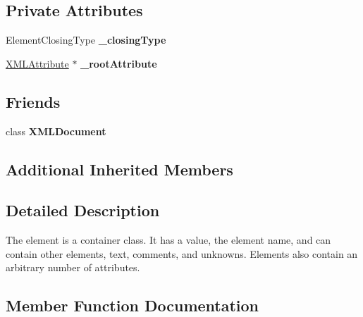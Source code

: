 \subsection*{Private Attributes}
\begin{DoxyCompactItemize}
\item 
Element\+Closing\+Type {\bfseries \+\_\+closing\+Type}\hypertarget{classtinyxml2_1_1XMLElement_a3f3f8f60bc21aae4c1bb9470d7ab0823}{}\label{classtinyxml2_1_1XMLElement_a3f3f8f60bc21aae4c1bb9470d7ab0823}

\item 
\hyperlink{classtinyxml2_1_1XMLAttribute}{X\+M\+L\+Attribute} $\ast$ {\bfseries \+\_\+root\+Attribute}\hypertarget{classtinyxml2_1_1XMLElement_ad067115a9f42b2df1fcdf3e0355f2789}{}\label{classtinyxml2_1_1XMLElement_ad067115a9f42b2df1fcdf3e0355f2789}

\end{DoxyCompactItemize}
\subsection*{Friends}
\begin{DoxyCompactItemize}
\item 
class {\bfseries X\+M\+L\+Document}\hypertarget{classtinyxml2_1_1XMLElement_a4eee3bda60c60a30e4e8cd4ea91c4c6e}{}\label{classtinyxml2_1_1XMLElement_a4eee3bda60c60a30e4e8cd4ea91c4c6e}

\end{DoxyCompactItemize}
\subsection*{Additional Inherited Members}


\subsection{Detailed Description}
The element is a container class. It has a value, the element name, and can contain other elements, text, comments, and unknowns. Elements also contain an arbitrary number of attributes. 

\subsection{Member Function Documentation}
